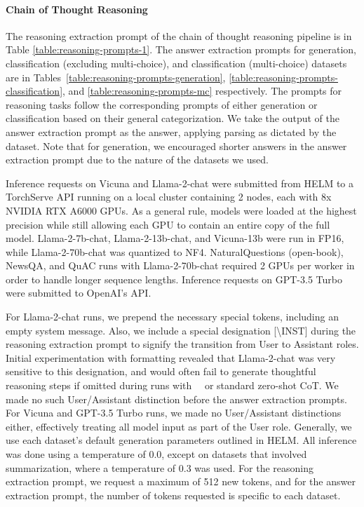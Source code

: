 

\newpage
\paragraph{Chain of Thought Reasoning}
\label{sec:inference-setup}
The reasoning extraction prompt of the chain of thought reasoning pipeline is in Table \ref{table:reasoning-prompts-1}. The answer extraction prompts for generation, classification (excluding multi-choice), and classification (multi-choice) datasets are in Tables~\ref{table:reasoning-prompts-generation}, \ref{table:reasoning-prompts-classification}, and \ref{table:reasoning-prompts-mc} respectively. The prompts for reasoning tasks follow the corresponding prompts of either generation or classification based on their general categorization. We take the output of the answer extraction prompt as the answer, applying parsing as dictated by the dataset. Note that for generation, we encouraged shorter answers in the answer extraction prompt due to the nature of the datasets we used. 





Inference requests on Vicuna and Llama-2-chat were submitted from HELM to a TorchServe API running on a local cluster containing 2 nodes, each with 8x NVIDIA RTX A6000 GPUs. As a general rule, models were loaded at the highest precision while still allowing each GPU to contain an entire copy of the full model. Llama-2-7b-chat, Llama-2-13b-chat, and Vicuna-13b were run in FP16, while Llama-2-70b-chat was quantized to NF4. NaturalQuestions (open-book), NewsQA, and QuAC runs with Llama-2-70b-chat required 2 GPUs per worker in order to handle longer sequence lengths. Inference requests on GPT-3.5 Turbo were submitted to OpenAI's API.

For Llama-2-chat runs, we prepend the necessary special tokens, including an empty system message. Also, we include a special designation [\textbackslash INST] during the reasoning extraction prompt to signify the transition from User to Assistant roles. Initial experimentation with formatting revealed that Llama-2-chat was very sensitive to this designation, and would often fail to generate thoughtful reasoning steps if omitted during runs with \zeroshotmid\ \method\ or standard zero-shot CoT. We made no such User/Assistant distinction before the answer extraction prompts. For Vicuna and GPT-3.5 Turbo runs, we made no User/Assistant distinctions either, effectively treating all model input as part of the User role. Generally, we use each dataset's default generation parameters outlined in HELM. All inference was done using a temperature of 0.0, except on datasets that involved summarization, where a temperature of 0.3 was used. For the reasoning extraction prompt, we request a maximum of 512 new tokens, and for the answer extraction prompt, the number of tokens requested is specific to each dataset.
